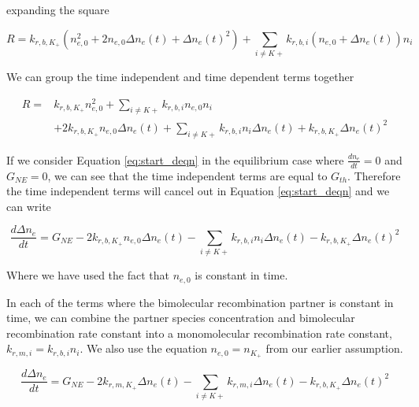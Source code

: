 expanding the square

\begin{equation}
R = k_{r, b, K_{+}}(n_{e,0}^2 + 2n_{e,0}\Delta n_{e}(t) + \Delta n_{e}(t)^2) + \sum_{i \neq K+}^{}k_{r, b, i}(n_{e,0} + \Delta n_{e}(t))n_{i}
\end{equation}

We can group the time independent and time dependent terms together


\begin{align}
R = & k_{r, b, K_{+}}n_{e,0}^2 + \sum_{i \neq K+}^{}k_{r, b, i}n_{e,0}n_{i} \nonumber \\
    & + 2k_{r, b, K_{+}}n_{e,0}\Delta n_{e}(t) + \sum_{i \neq K+}^{}k_{r, b, i} n_{i}\Delta n_{e}(t) + k_{r, b, K_{+}}\Delta n_{e}(t)^2 
\end{align}

If we consider Equation \ref{eq:start_deqn} in the equilibrium case where $\frac{dn_{e}}{dt} = 0$ and $G_{NE} = 0$, we can see that the time independent terms are equal to $G_{th}$. Therefore the time independent terms will cancel out in Equation \ref{eq:start_deqn} and we can write

\begin{equation}
\frac{d\Delta n_{e}}{dt} = G_{NE}  -  2k_{r, b, K_{+}}n_{e,0}\Delta n_{e}(t) - \sum_{i \neq K+}^{}k_{r, b, i} n_{i} \Delta n_{e}(t)- k_{r, b, K_{+}}\Delta n_{e}(t)^2
\end{equation}

Where we have used the fact that $n_{e,0}$ is constant in time. 

In each of the terms where the bimolecular recombination partner is constant in time, we can combine the partner species concentration and bimolecular recombination rate constant into a monomolecular recombination rate constant, $k_{r, m, i} = k_{r, b, i}n_{i}$. We also use the equation $n_{e,0} = n_{K_{+}}$ from our earlier assumption. 

\begin{equation}
\frac{d\Delta n_{e}}{dt} = G_{NE}   -   2k_{r, m, K_{+}}\Delta n_{e}(t) - \sum_{i \neq K+}^{}k_{r, m, i}\Delta n_{e}(t) - k_{r, b, K_{+}}\Delta n_{e}(t)^2
\end{equation}

